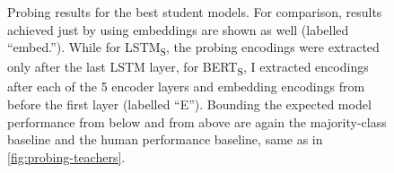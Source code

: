 \documentclass[bsc,frontabs,singlespacing,parskip,deptreport]{infthesis}
\def\BERTS{BERT\textsubscript{S}}
\def\LSTMS{LSTM\textsubscript{S}}
\begin{document}
{{{      \begin{figure}[h!tb]
        \centering
        \caption{Probing results for the best student models. For comparison, results achieved just by using embeddings are shown as well (labelled ``embed.''). While for \LSTMS, the probing encodings were extracted only after the last LSTM layer, for \BERTS, I extracted encodings after each of the 5 encoder layers and embedding encodings from before the first layer (labelled ``E''). Bounding the expected model performance from below and from above are again the majority-class baseline and the human performance baseline, same as in \autoref{fig:probing-teachers}.}
        \label{fig:probing-students}
      \end{figure}

}}}
\end{document}
